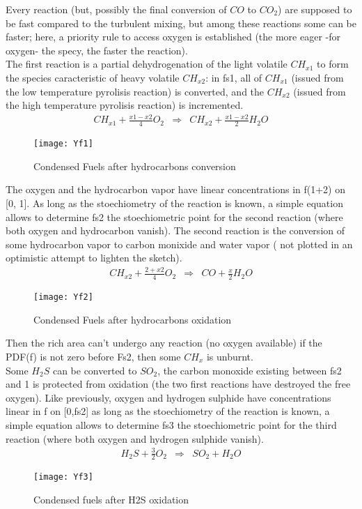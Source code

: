 Every reaction (but, possibly the final conversion of $CO$ to $CO_{2}$) are
supposed to be fast compared to the turbulent mixing, but among these reactions
some can be faster; here, a priority rule to access oxygen is established (the
more eager -for oxygen- the specy, the faster the reaction).\\

The first reaction is a partial dehydrogenation of the light volatile $CH_{x1}$
to form the species caracteristic of heavy volatile $CH_{x2}$: in fs1, all of
$CH_{x1}$ (issued from the low temperature pyrolisis reaction) is converted, and
the $CH_{x2}$ (issued from the high temperature pyrolisis reaction) is
incremented.
\begin{eqnarray}
CH_{x1} + \displaystyle\frac{x1-x2}{4} O_{2} &\Rightarrow& CH_{x2} + \frac{x1-x2}{2} H_{2}O
\end{eqnarray}
\begin{figure}[h]
\centerline{\texttt{[image: Yf1]}}
\caption{Condensed Fuels after hydrocarbons conversion} 
\end{figure}
 
The oxygen and the hydrocarbon vapor have linear concentrations in f(1+2) on [0,
1]. As long as the stoechiometry of the reaction is known, a simple equation
allows to determine fs2 the stoechiometric point for the second reaction
({\small where both oxygen and hydrocarbon vanish}). The second reaction is the
conversion of some hydrocarbon vapor to carbon monixide and water vapor ({\small
  not plotted in an optimistic attempt to lighten the sketch}).
\begin{eqnarray}
CH_{x2} + \displaystyle \frac{2+x2}{4} O_{2} &\Rightarrow& CO + \frac{x}{2} H_{2}O 
\end{eqnarray}
\begin{figure}[h!]
\centerline{\texttt{[image: Yf2]}}
\caption{Condensed Fuels after hydrocarbons oxidation}
\end{figure}

Then the rich area can't undergo any reaction (no oxygen available) if the PDF(f) is not zero before Fs2, then some $CH_{x}$ is unburnt.\\
Some $H_{2}S$ can be converted to $SO_{2}$, the carbon monoxide existing between
fs2 and 1 is protected from oxidation (the two first reactions have destroyed
the free oxygen). Like previously, oxygen and hydrogen sulphide have
concentrations linear in f on [0,fs2] as long as the stoechiometry of the
reaction is known, a simple equation allows to determine fs3 the stoechiometric
point for the third reaction (where both oxygen and hydrogen sulphide vanish).
\begin{eqnarray}
H_{2}S + \displaystyle\frac{3}{2} O_{2} &\Rightarrow& SO_{2} + H_{2}O 
\end{eqnarray}
\begin{figure}[h!]
\centerline{\texttt{[image: Yf3]}}
\caption{Condensed fuels after H2S oxidation}
\end{figure}

